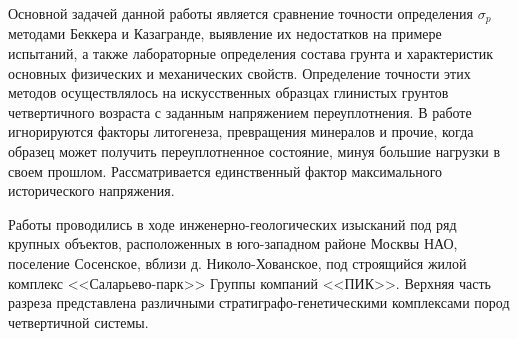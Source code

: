 Основной задачей данной работы является сравнение точности определения $\sigma_p$ методами Беккера и Казагранде, выявление их недостатков на примере испытаний, а также лабораторные определения состава грунта и характеристик основных физических и механических свойств. 
Определение точности этих методов осуществлялось на искусственных образцах глинистых грунтов четвертичного возраста с заданным напряжением переуплотнения. 
В работе игнорируются факторы литогенеза, превращения минералов и прочие, когда образец может получить переуплотненное состояние, минуя большие нагрузки в своем прошлом. 
Рассматривается единственный фактор максимального исторического напряжения.


Работы проводились в ходе инженерно-геологических изысканий под ряд крупных объектов, расположенных в юго-западном районе Москвы НАО, поселение Сосенское, вблизи д. Николо-Хованское, под строящийся жилой комплекс <<Саларьево-парк>> Группы компаний <<ПИК>>. 
Верхняя часть разреза представлена различными стратиграфо-генетическими комплексами пород четвертичной системы. 